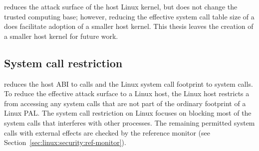 
\graphene{} reduces the attack surface of the host Linux kernel, but does not change the trusted computing base; however, reducing the effective system call table size of a \picoproc{} does facilitate adoption of a smaller host kernel.
This thesis leaves the creation of a smaller host kernel for future work.

\subsection{System call restriction}
\label{sec:linux:security:syscall-restriction}


\graphene{} reduces the host ABI to \palcallnum{} calls
and the Linux system call footprint to \hostsyscallnum{} system calls.
To reduce the effective attack surface to a Linux host,
the Linux host restricts a \picoproc{} from accessing any system calls that are not part of the ordinary footprint of a Linux PAL.
The system call restriction on Linux focuses on blocking most of the system calls
that interferes with other processes.
The remaining permitted system calls with external effects are checked by 
the reference monitor (see Section~\ref{sec:linux:security:ref-monitor}).
 







